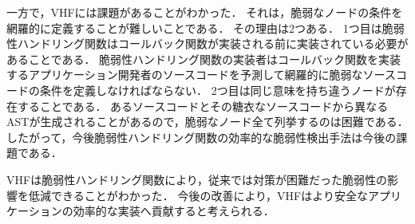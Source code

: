\documentclass[a4paper,12pt]{jreport}
\begin{document}
一方で，VHFには課題があることがわかった．
それは，脆弱なノードの条件を網羅的に定義することが難しいことである．
その理由は2つある．
1つ目は脆弱性ハンドリング関数はコールバック関数が実装される前に実装されている必要があることである．
脆弱性ハンドリング関数の実装者はコールバック関数を実装するアプリケーション開発者のソースコードを予測して網羅的に脆弱なソースコードの条件を定義しなければならない．
2つ目は同じ意味を持ち違うノードが存在することである．
あるソースコードとその糖衣なソースコードから異なるASTが生成されることがあるので，脆弱なノード全て列挙するのは困難である．
したがって，今後脆弱性ハンドリング関数の効率的な脆弱性検出手法は今後の課題である．

VHFは脆弱性ハンドリング関数により，従来では対策が困難だった脆弱性の影響を低減できることがわかった．
今後の改善により，VHFはより安全なアプリケーションの効率的な実装へ貢献すると考えられる．



\end{document}
